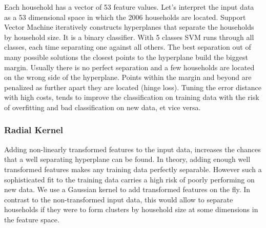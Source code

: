 \documentclass[]{article}
\newenvironment{Shaded}{\begin{snugshade}}{\end{snugshade}}
\newcommand{\DataTypeTok}[1]{\textcolor[rgb]{0.13,0.29,0.53}{#1}}
\newcommand{\DecValTok}[1]{\textcolor[rgb]{0.00,0.00,0.81}{#1}}
\newcommand{\FloatTok}[1]{\textcolor[rgb]{0.00,0.00,0.81}{#1}}
\newcommand{\KeywordTok}[1]{\textcolor[rgb]{0.13,0.29,0.53}{\textbf{#1}}}
\newcommand{\NormalTok}[1]{#1}
\newcommand{\OperatorTok}[1]{\textcolor[rgb]{0.81,0.36,0.00}{\textbf{#1}}}
\newcommand{\StringTok}[1]{\textcolor[rgb]{0.31,0.60,0.02}{#1}}
\begin{document}
Each household has a vector of 53 feature values. Let's interpret the
input data as a 53 dimensional space in which the 2006 households are
located. Support Vector Machine iteratively constructs hyperplanes that
separate the households by household size. It is a binary classifier.
With 5 classes SVM runs through all classes, each time separating one
against all others. The best separation out of many possible solutions
the closest points to the hyperplane build the biggest margin. Usually
there is no perfect separation and a few households are located on the
wrong side of the hyperplane. Points within the margin and beyond are
penalized as further apart they are located (hinge loss). Tuning the
error distance with high costs, tends to improve the classification on
training data with the risk of overfitting and bad classification on new
data, et vice versa.

\begin{Shaded}
\end{Shaded}

\hypertarget{radial-kernel}{%
\subsubsection{Radial Kernel}\label{radial-kernel}}

Adding non-linearly transformed features to the input data, increases
the chances that a well separating hyperplane can be found. In theory,
adding enough well transformed features makes any training data
perfectly separable. However such a sophisticated fit to the training
data carries a high risk of poorly performing on new data. We use a
Gaussian kernel to add transformed features on the fly. In contrast to
the non-transformed input data, this would allow to separate households
if they were to form clusters by household size at some dimensions in
the feature space.

\begin{Shaded}
\end{Shaded}
\end{document}
